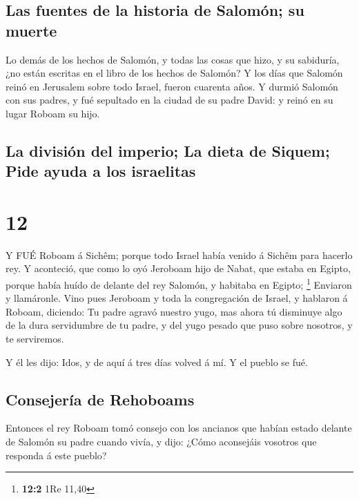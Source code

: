 \hypertarget{las-fuentes-de-la-historia-de-salomuxf3n-su-muerte}{%
\subsection{Las fuentes de la historia de Salomón; su
muerte}\label{las-fuentes-de-la-historia-de-salomuxf3n-su-muerte}}

 Lo demás de los hechos de Salomón, y todas las cosas que
hizo, y su sabiduría, ¿no están escritas en el libro de los hechos de
Salomón?  Y los días que Salomón reinó en Jerusalem sobre
todo Israel, fueron cuarenta años.  Y durmió Salomón con
sus padres, y fué sepultado en la ciudad de su padre David: y reinó en
su lugar Roboam su hijo.

\hypertarget{la-divisiuxf3n-del-imperio-la-dieta-de-siquem-pide-ayuda-a-los-israelitas}{%
\subsection{La división del imperio; La dieta de Siquem; Pide ayuda a
los
israelitas}\label{la-divisiuxf3n-del-imperio-la-dieta-de-siquem-pide-ayuda-a-los-israelitas}}

\hypertarget{section-11}{%
\section{12}\label{section-11}}

 Y FUÉ Roboam á Sichêm; porque todo Israel había venido á
Sichêm para hacerlo rey.  Y aconteció, que como lo oyó
Jeroboam hijo de Nabat, que estaba en Egipto, porque había huído de
delante del rey Salomón, y habitaba en Egipto; \footnote{\textbf{12:2}
  1Re 11,40}  Enviaron y llamáronle. Vino pues Jeroboam y
toda la congregación de Israel, y hablaron á Roboam, diciendo:
 Tu padre agravó nuestro yugo, mas ahora tú disminuye algo
de la dura servidumbre de tu padre, y del yugo pesado que puso sobre
nosotros, y te serviremos.

 Y él les dijo: Idos, y de aquí á tres días volved á mí. Y
el pueblo se fué.

\hypertarget{consejeruxeda-de-rehoboams}{%
\subsection{Consejería de Rehoboams}\label{consejeruxeda-de-rehoboams}}

 Entonces el rey Roboam tomó consejo con los ancianos que
habían estado delante de Salomón su padre cuando vivía, y dijo: ¿Cómo
aconsejáis vosotros que responda á este pueblo?


